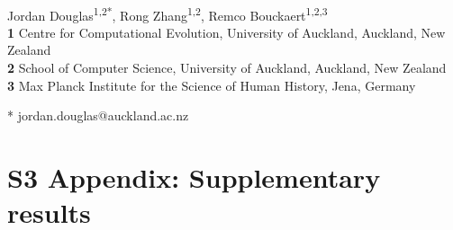 \documentclass[12pt]{article}
\begin{document}
\vspace*{0.2in}

\begin{flushleft}
{\Large
\textbf{} %
}
\newline
\\
Jordan Douglas\textsuperscript{1,2*},
Rong Zhang\textsuperscript{1,2},
Remco Bouckaert\textsuperscript{1,2,3}
\\
\bigskip
\textbf{1} Centre for Computational Evolution,  University of Auckland, Auckland, New Zealand\\
\textbf{2} School of Computer Science, University of Auckland, Auckland, New Zealand\\
\textbf{3} Max Planck Institute for the Science of Human History, Jena, Germany\\
\bigskip


* jordan.douglas@auckland.ac.nz


\end{flushleft}


\section*{S3 Appendix: Supplementary results}
\end{document}
